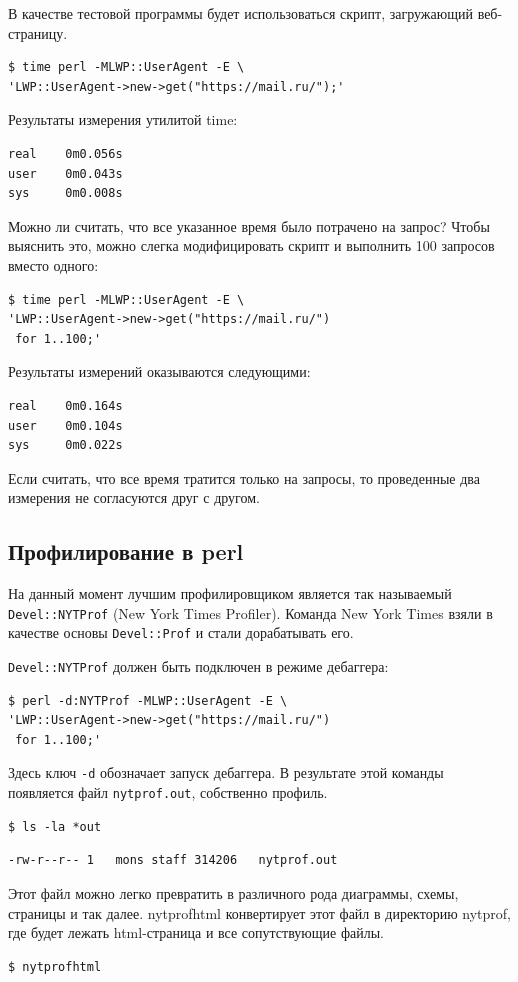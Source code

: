 В качестве тестовой программы будет использоваться скрипт, загружающий веб-страницу.
\begin{verbatim}
$ time perl -MLWP::UserAgent -E \
'LWP::UserAgent->new->get("https://mail.ru/");'
\end{verbatim}

Результаты измерения утилитой time:
\begin{verbatim}
real    0m0.056s
user    0m0.043s
sys     0m0.008s
\end{verbatim}
Можно ли считать, что все указанное время было потрачено на запрос? Чтобы выяснить это, можно слегка модифицировать скрипт и выполнить 100 запросов вместо одного:

\begin{verbatim}
$ time perl -MLWP::UserAgent -E \
'LWP::UserAgent->new->get("https://mail.ru/")
 for 1..100;'
\end{verbatim}

Результаты измерений оказываются следующими:
\begin{verbatim}
real    0m0.164s
user    0m0.104s
sys     0m0.022s
\end{verbatim}
Если считать, что все время тратится только на запросы, то проведенные два измерения не согласуются друг с другом.

\subsection{Профилирование в perl}
На данный момент лучшим профилировщиком является так называемый \verb|Devel::NYTProf| (New York Times Profiler). Команда New York Times взяли в качестве основы \verb|Devel::Prof| и стали дорабатывать его.

\verb|Devel::NYTProf| должен быть подключен в режиме дебаггера:
\begin{verbatim}
$ perl -d:NYTProf -MLWP::UserAgent -E \
'LWP::UserAgent->new->get("https://mail.ru/")
 for 1..100;'
\end{verbatim}
Здесь ключ \verb|-d| обозначает запуск дебаггера. В результате этой команды появляется файл \verb|nytprof.out|, собственно профиль.
\begin{verbatim}
$ ls -la *out
\end{verbatim}
\begin{verbatim}
-rw-r--r-- 1   mons staff 314206   nytprof.out
\end{verbatim}
Этот файл можно легко превратить в различного рода диаграммы, схемы, страницы и так далее. nytprofhtml конвертирует этот файл в директорию nytprof, где будет лежать html-страница и все сопутствующие файлы.
\begin{verbatim}
$ nytprofhtml
\end{verbatim}

